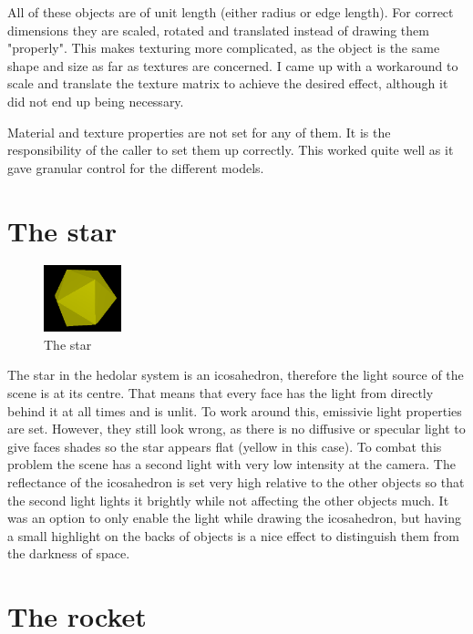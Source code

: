 \documentclass[10pt]{article}
\begin{document}
        All of these objects are of unit length (either radius or edge length).
        For correct dimensions they are scaled, rotated and translated instead
        of drawing them "properly". This makes texturing more complicated, as
        the object is the same shape and size as far as textures are concerned. I
        came up with a workaround to scale and translate the texture matrix to
        achieve the desired effect, although it did not end up being necessary.

        Material and texture properties are not set for any of them. It is the
        responsibility of the caller to set them up correctly. This worked
        quite well as it gave granular control for the different models.


    \section{The star}

        \begin{figure}
            \caption{The star}
            \includegraphics[width=0.2\textwidth]{star}
        \end{figure}

        The star in the hedolar system is an icosahedron, therefore the light
        source of the scene is at its centre. That means that every face has
        the light from directly behind it at all times and is unlit. To work
        around this, emissivie light properties are set. However, they still
        look wrong, as there is no diffusive or specular light to give faces
        shades so the star appears flat (yellow in this case). To combat this
        problem the scene has a second light with very low intensity at the
        camera. The reflectance of the icosahedron is set very high relative to
        the other objects so that the second light lights it brightly while not
        affecting the other objects much. It was an option to only enable the
        light while drawing the icosahedron, but having a small highlight on
        the backs of objects is a nice effect to distinguish them from the
        darkness of space.


    \section{The rocket}
\end{document}
